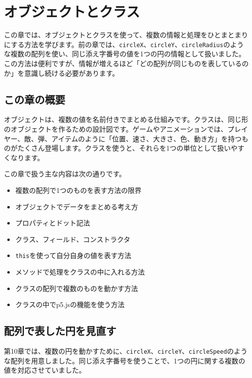 \chapter{オブジェクトとクラス}
\label{chap:objects-and-classes}

この章では、オブジェクトとクラスを使って、複数の情報と処理をひとまとまりにする方法を学びます。前の章では、\texttt{circleX}、\texttt{circleY}、\texttt{circleRadius}のような複数の配列を使い、同じ添え字番号の値を1つの円の情報として扱いました。この方法は便利ですが、情報が増えるほど「どの配列が同じものを表しているのか」を意識し続ける必要があります。

\section{この章の概要}

オブジェクトは、複数の値を名前付きでまとめる仕組みです。クラスは、同じ形のオブジェクトを作るための設計図です。ゲームやアニメーションでは、プレイヤー、敵、弾、アイテムのように「位置、速さ、大きさ、色、動き方」を持つものがたくさん登場します。クラスを使うと、それらを1つの単位として扱いやすくなります。

この章で扱う主な内容は次の通りです。

\begin{itemize}
    \item 複数の配列で1つのものを表す方法の限界
    \item オブジェクトでデータをまとめる考え方
    \item プロパティとドット記法
    \item クラス、フィールド、コンストラクタ
    \item \texttt{this}を使って自分自身の値を表す方法
    \item メソッドで処理をクラスの中に入れる方法
    \item クラスの配列で複数のものを動かす方法
    \item クラスの中でp5.jsの機能を使う方法
\end{itemize}

\section{配列で表した円を見直す}

第10章では、複数の円を動かすために、\texttt{circleX}、\texttt{circleY}、\texttt{circleSpeed}のような配列を用意しました。同じ添え字番号を使うことで、1つの円に関する複数の値を対応させていました。


